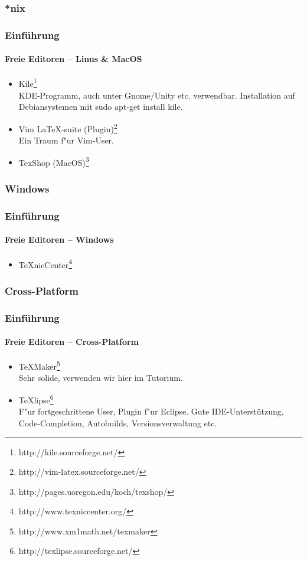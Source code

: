 \subsubsection{*nix}
\begin{frame}
\frametitle{Einf\"uhrung}
\framesubtitle{Freie Editoren -- Linus \& MacOS }
\begin{itemize}
 \item Kile\footnote{http://kile.sourceforge.net/}\\KDE-Programm, auch unter Gnome\slash Unity etc.
 verwendbar. Installation auf Debiansystemen mit {\ttfamily sudo apt-get
 install kile}.
  \item Vim \LaTeX -suite (Plugin)\footnote{http://vim-latex.sourceforge.net/}\\
  Ein Traum f"ur Vim-User.
  \item TexShop (MacOS)\footnote{http://pages.uoregon.edu/koch/texshop/}
\end{itemize}
\end{frame}


\subsubsection{Windows}
\begin{frame}
\frametitle{Einf\"uhrung}
\framesubtitle{Freie Editoren -- Windows}
\begin{itemize}
\item TeXnicCenter\footnote{http://www.texniccenter.org/}
\end{itemize}
\end{frame}


\subsubsection{Cross-Platform}
\begin{frame}
\frametitle{Einf\"uhrung}
\framesubtitle{Freie Editoren -- Cross-Platform}
\begin{itemize}
  \item TeXMaker\footnote{http://www.xm1math.net/texmaker}\\
   Sehr solide, verwenden wir hier im Tutorium.
  \item TeXlipse\footnote{http://texlipse.sourceforge.net/}\\ F"ur fortgeschrittene User, Plugin f"ur
  Eclipse. Gute IDE-Unterst\"utzung, Code-Completion, Autobuilds, Versionsverwaltung etc.
\end{itemize}
\end{frame}

